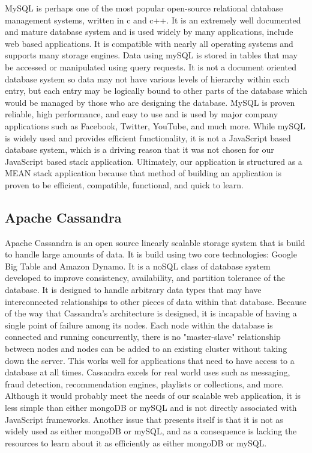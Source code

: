 \documentclass[onecolumn, draftclsnofoot,10pt, compsoc]{IEEEtran}
\begin{document}
		MySQL is perhaps one of the most popular open-source relational database management systems, written in c and c++. It is an extremely well documented and mature database system and 
		is used widely by many applications, include web based applications. It is compatible with nearly all operating systems and supports many storage engines. Data 
		using mySQL is stored in tables that may be accessed or manipulated using query requests. It is not a document oriented database system so data may not have 
		various levels of hierarchy within each entry, but each entry may be logically bound to other parts of the database which would be managed by those who
		are designing the database. MySQL is proven reliable, high performance, and easy to use and is used by major company applications such as Facebook, Twitter, YouTube, and much more.
		While mySQL is widely used and provides efficient functionality, it is not a JavaScript based database system, which is a driving reason that it was 
		not chosen for our JavaScript based stack application. Ultimately, our application is structured as a MEAN stack application because that method of 
		building an application is proven to be efficient, compatible, functional, and quick to learn.
		
	\subsection{Apache Cassandra}
	
		Apache Cassandra is an open source linearly scalable storage system that is build to handle large amounts of data. It is build using two core technologies: Google Big Table
		and Amazon Dynamo. It is a noSQL class of database system developed to improve consistency, availability, and partition tolerance of the database. It is designed
		to handle arbitrary data types that may have interconnected relationships to other pieces of data within that database. Because of the way that Cassandra's architecture 
		is designed, it is incapable of having a single point of failure among its nodes. Each node within the database is connected and running concurrently, there is no 
		"master-slave" relationship between nodes and nodes can be added to an existing cluster without taking down the server. This works well for applications that need to 
		have access to a database at all times. Cassandra excels for real world uses such as messaging, fraud detection, recommendation engines, playlists or collections, and more.
		Although it would probably meet the needs of our scalable web application, it is less simple than either mongoDB or mySQL and is not directly associated with JavaScript frameworks.
		Another issue that presents itself is that it is not as widely used as either mongoDB or mySQL, and as a consequence is lacking the resources to learn about it as efficiently
		as either mongoDB or mySQL.
		
\end{document}
